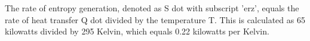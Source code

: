 The rate of entropy generation, denoted as S dot with subscript 'erz', equals the rate of heat transfer Q dot divided by the temperature T. This is calculated as 65 kilowatts divided by 295 Kelvin, which equals 0.22 kilowatts per Kelvin.